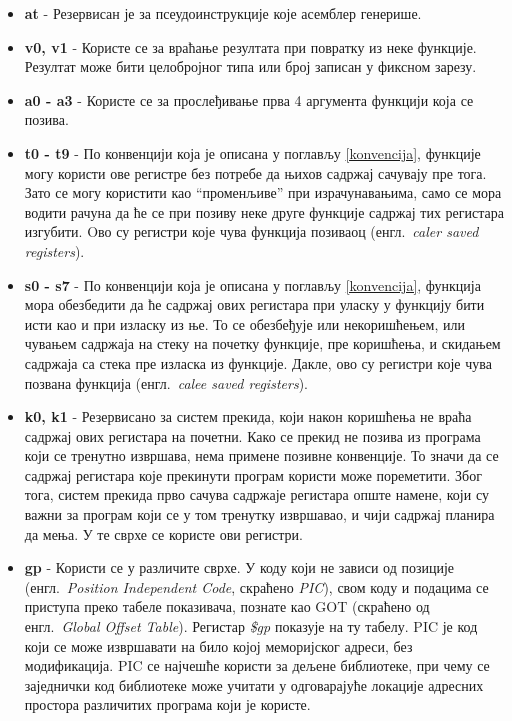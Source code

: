 \documentclass[12pt,oneside]{memoir}
\begin{document}
\begin{itemize}
\item \textbf{at} - Резервисан је за псеудоинструкције које асемблер генерише.

\item \textbf{v0, v1} - Користе се за враћање резултата при повратку из неке функције. Резултат може бити целобројног типа или број записан у фиксном зарезу.

\item \textbf{a0 - a3} - Користе се за прослеђивање прва 4 аргумента функцији која се позива. 

\item \textbf{t0 - t9} - По конвенцији која је описана у поглављу \ref{konvencija}, функције могу користи ове регистре без потребе да њихов садржај сачувају пре тога. Зато се могу користити као “променљиве” при израчунавањима, само се мора водити рачуна да ће се при позиву неке друге функције садржај тих регистара изгубити. Oво су регистри које чува функција позиваоц (енгл.~\textit{caler saved registers}).

\item \textbf{s0 - s7} - По конвенцији која је описана у поглављу \ref{konvencija}, функција мора обезбедити да ће садржај ових регистара при уласку у функцију бити исти као и при изласку из ње. То се обезбеђује или некоришћењем, или чувањем садржаја на стеку на почетку функције, пре коришћења, и скидањем садржаја са стека пре изласка из функције. Дакле, ово су регистри које чува позвана функција (енгл.~\textit{calee saved registers}).

\item \textbf{k0, k1} - Резервисано за систем прекида, који након коришћења не враћа садржај ових регистара на почетни. Како се прекид не позива из програма који се тренутно извршава, нема примене позивне конвенције. То значи да се садржај регистара које прекинути програм користи може пореметити. Због тога, систем прекида прво сачува садржаје регистара опште намене, који су важни за програм који се у том тренутку извршавао, и чији садржај планира да мења. У те сврхе се користе ови регистри.

\item \textbf{gp} - Користи се у различите сврхе. У коду који не зависи од позиције (енгл.~\textit{Position Independent Code}, скраћено \textit{PIC}), свом коду и подацима се приступа преко табеле показивача, познате као GOT (скраћено од енгл.~\textit{Global Offset Table}). Регистар \textit{\$gp} показује на ту табелу. PIC је код који се може извршавати на било којој меморијског адреси, без модификација. PIC се најчешће користи за дељене библиотеке, при чему се заједнички код библиотеке може учитати у одговарајуће локације адресних простора различитих програма који је користе.


\end{itemize}
\end{document}
